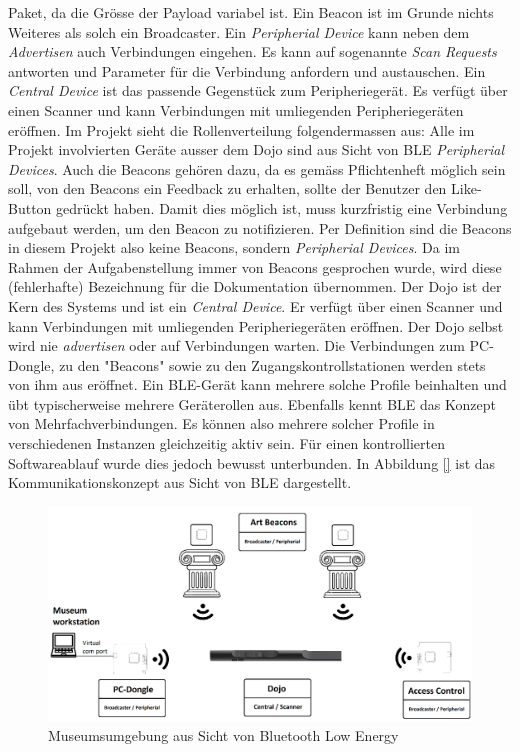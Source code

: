 Paket, da die Grösse der Payload variabel ist. Ein Beacon ist im Grunde nichts Weiteres als solch ein
Broadcaster.
Ein \textit{Peripherial Device} kann neben dem \textit{Advertisen} auch Verbindungen eingehen.
Es kann auf sogenannte \textit{Scan Requests} antworten und Parameter für die Verbindung anfordern und austauschen. 
Ein \textit{Central Device} ist das passende Gegenstück zum Peripheriegerät. Es verfügt über einen Scanner und 
kann Verbindungen mit umliegenden Peripheriegeräten eröffnen.
Im Projekt sieht die Rollenverteilung folgendermassen aus:
Alle im Projekt involvierten Geräte ausser dem Dojo sind aus Sicht von BLE \textit{Peripherial Devices}. Auch 
die Beacons gehören dazu, da es gemäss Pflichtenheft möglich sein soll, von den Beacons ein Feedback
zu erhalten, sollte der Benutzer den Like-Button gedrückt haben. Damit dies möglich ist, muss kurzfristig 
eine Verbindung aufgebaut werden, um den Beacon zu notifizieren. Per Definition sind die Beacons in
diesem Projekt also keine Beacons, sondern \textit{Peripherial Devices}. Da im Rahmen der Aufgabenstellung immer 
von Beacons gesprochen wurde, wird diese (fehlerhafte) Bezeichnung für die Dokumentation übernommen. 
Der Dojo ist der Kern des Systems und ist ein \textit{Central Device}. Er verfügt über einen Scanner und kann
Verbindungen mit umliegenden Peripheriegeräten eröffnen. Der Dojo selbst wird nie \textit{advertisen} oder auf 
Verbindungen warten. Die Verbindungen zum PC-Dongle, zu den "Beacons" sowie zu den 
Zugangskontrollstationen werden stets von ihm aus eröffnet.
Ein BLE-Gerät kann mehrere solche Profile beinhalten und übt typischerweise mehrere Geräterollen aus. 
Ebenfalls kennt BLE das Konzept von Mehrfachverbindungen. Es können also mehrere solcher Profile in
verschiedenen Instanzen gleichzeitig aktiv sein. Für einen kontrollierten Softwareablauf wurde dies 
jedoch bewusst unterbunden. In Abbildung \ref{} ist das Kommunikationskonzept aus Sicht von BLE dargestellt.
\begin{figure}[h]
	\centering
	\includegraphics[width=\textwidth]{graphics/platzhalter.png}
	\caption{Museumsumgebung aus Sicht von Bluetooth Low Energy}
	\label{fig:soft_1}
\end{figure}

